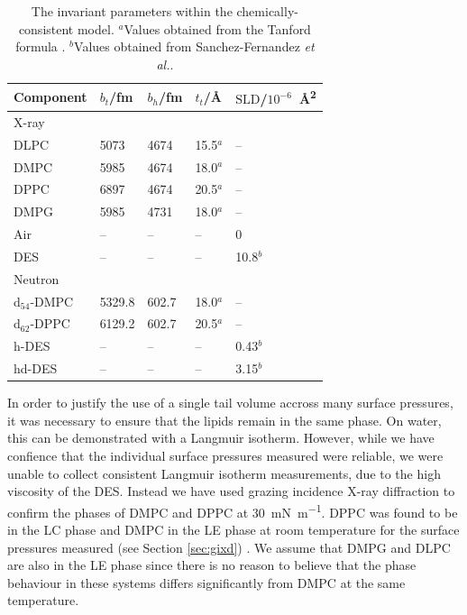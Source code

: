 \documentclass[amsmath,amssymb,twocolumn,superscriptaddress]{revtex4-1}
\begin{document}
\begin{table}
	\caption{\label{tab:invariant} The invariant parameters within the chemically-consistent model.
	$^a$Values obtained from the Tanford formula \cite{Tanford1980}.
  $^b$Values obtained from Sanchez-Fernandez \emph{et al.}\cite{Sanchez-Fernandez2016}.}
  \begin{ruledtabular}
  \begin{tabular*}{0.48\textwidth}{lllll}
		Component & $b_t$/\si{\femto\meter} & $b_h$/\si{\femto\meter} & $t_t$/\si{\angstrom} & $\text{SLD}$/$10^{-6}$\si{\per\angstrom\squared} \\
		\hline
		X-ray & & & & \\
		DLPC & 5073 & 4674 & 15.5$^a$ & -- \\
		DMPC & 5985 & 4674 & 18.0$^a$ & -- \\
		DPPC & 6897 & 4674 & 20.5$^a$ & -- \\
		DMPG & 5985 & 4731 & 18.0$^a$ & --\\
		Air & -- & -- & -- & 0\\
		DES & -- & -- & -- & 10.8$^b$ \\
		\hline
		Neutron & & & & \\
		d$_{54}$-DMPC & 5329.8 & 602.7 & 18.0$^a$ & -- \\
		d$_{62}$-DPPC & 6129.2 & 602.7 & 20.5$^a$ & -- \\
		h-DES & -- & -- & -- & 0.43$^b$  \\
		hd-DES & -- & -- & -- & 3.15$^b$ \\
	\end{tabular*}
  \end{ruledtabular}
\end{table}
%

In order to justify the use of a single tail volume accross many surface pressures, it was necessary to ensure that the lipids remain in the same phase.
On water, this can be demonstrated with a Langmuir isotherm.
However, while we have confience that the individual surface pressures measured were reliable, we were unable to collect consistent Langmuir isotherm measurements, due to the high viscosity of the DES.
Instead we have used grazing incidence X-ray diffraction to confirm the
phases of DMPC and DPPC at \SI{30}{\milli\newton\per\meter}.
DPPC was found to be in the LC phase and DMPC in the LE phase at room
temperature for the surface pressures measured (see Section \ref{sec:gixd}) \cite{SI2019}.
We assume that DMPG and DLPC are also in the LE phase since there is no
reason to believe that the phase behaviour in these systems differs
significantly from DMPC at the same temperature.
\end{document}
